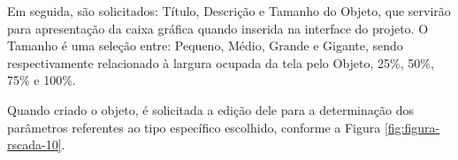 Em seguida, são solicitados: Título, Descrição e Tamanho do Objeto, que servirão para apresentação da caixa gráfica quando inserida na interface do projeto. O Tamanho é uma seleção entre: Pequeno, Médio, Grande e Gigante, sendo respectivamente relacionado à largura ocupada da tela pelo Objeto, 25\%, 50\%, 75\% e 100\%.

        \begin{figure}[!h]
    	\end{figure}
    	
    	\begin{figure}[!h]
    	\end{figure}
    	
Quando criado o objeto, é solicitada a edição dele para a determinação dos parâmetros referentes ao tipo específico escolhido, conforme a Figura \ref{fig:figura-rscada-10}.
        
        \begin{figure}[!h]
    	\end{figure}
    	
